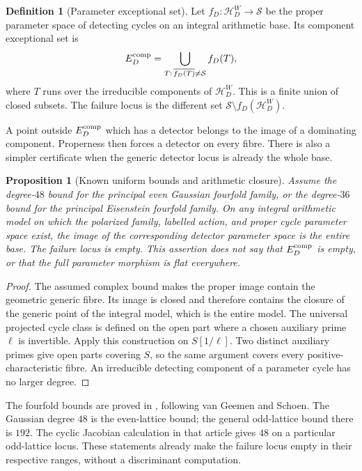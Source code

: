 \documentclass[11pt]{article}
\newtheorem{proposition}[theorem]{Proposition}
\theoremstyle{definition}
\newtheorem{definition}[theorem]{Definition}
\theoremstyle{remark}
\begin{document}
\begin{definition}[Parameter exceptional set]\label{def:exceptional}
Let $f_D:\mathscr H_D^W\to\mathcal S$ be the proper parameter
space of detecting cycles on an integral arithmetic base.  Its
component exceptional set is
\[
 E_D^{\rm comp}=\bigcup_{T:\,\overline{f_D(T)}\ne\mathcal S}f_D(T),
\]
where $T$ runs over the irreducible components of
$\mathscr H_D^W$.  This is a finite union of closed subsets.  The
failure locus is the different set
$\mathcal S\setminus f_D(\mathscr H_D^W)$.
\end{definition}

A point outside $E_D^{\rm comp}$ which has a detector belongs to
the image of a dominating component.  Properness then forces a
detector on every fibre.  There is also a simpler certificate when
the generic detector locus is already the whole base.

\begin{proposition}[Known uniform bounds and arithmetic closure]
\label{prop:known-fourfolds}
Assume the degree-$48$ bound for the principal even Gaussian
fourfold family, or the degree-$36$ bound for the principal
Eisenstein fourfold family.  On any integral arithmetic model on
which the polarized family, labelled action, and proper cycle
parameter space exist, the image of the corresponding detector
parameter space is the entire base.  The failure locus is empty.
This assertion does not say that $E_D^{\rm comp}$ is empty, or
that the full parameter morphism is flat everywhere.
\end{proposition}

\begin{proof}
The assumed complex bound makes the proper image contain the
geometric generic fibre.  Its image is closed and therefore
contains the closure of the generic point of the integral model,
which is the entire model.  The universal projected cycle class
is defined on the open part where a chosen auxiliary prime
$\ell$ is invertible.  Apply this construction on $S[1/\ell]$.
Two distinct auxiliary primes give open parts covering $S$, so the
same argument covers every positive-characteristic fibre.  An irreducible detecting component of a parameter cycle
has no larger degree.
\end{proof}

The fourfold bounds are proved in \cite[Theorem~10.1,
pp.~19--22]{Bounded}, following van Geemen and
Schoen.  The Gaussian degree $48$ is the even-lattice bound; the
general odd-lattice bound there is $192$.  The cyclic Jacobian
calculation in that article gives $48$ on a particular odd-lattice
locus.  These statements already make the failure locus empty in
their respective ranges, without a discriminant computation.
\end{document}
